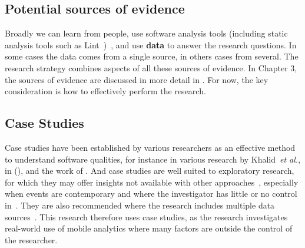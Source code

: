 \subsection{Potential sources of evidence}
Broadly we can learn from people, use software analysis tools (including static analysis tools such as Lint~)~, and use \textbf{data} to answer the research questions. In some cases the data comes from a single source, in others cases from several. The research strategy combines aspects of all these sources of evidence. In Chapter 3, the sources of evidence are discussed in more detail in \href{sec:potential-sources-of-evidence}{}. For now, the key consideration is how to effectively perform the research.

\subsection{Case Studies}
Case studies have been established by various researchers as an effective method to understand software qualities, for instance in various research by Khalid~\emph{et al.}, in (\citeyear{khalid2014_prioritizing_the_devices_to_test_your_app_on_casestudy_android_games, khalid2015_what_do_mobile_app_users_complain_about, khalid2016_examining_the_relationship_between_findbugs_warnings_and_app_ratings}), and the work of . And case studies are well suited to exploratory research, for which they may offer insights not available with other approaches~, especially when events are contemporary and where the investigator has little or no control in~. They are also recommended where the research includes multiple data sources~. This research therefore uses case studies, as the research investigates real-world use of mobile analytics where many factors are outside the control of the researcher.


